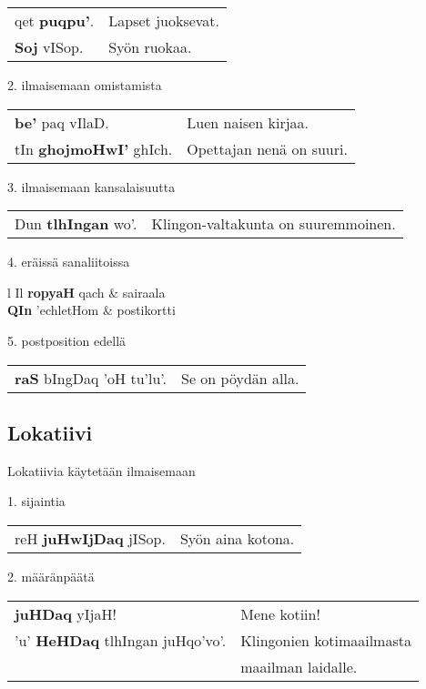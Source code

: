 \documentclass{book}
\begin{document}
\begin{tabular}{l l}
    qet \textbf{puqpu'}. & Lapset juoksevat. \\
    \textbf{Soj} vISop. & Syön ruokaa. \\
\end{tabular}

2. ilmaisemaan omistamista

\begin{tabular}{l l}
    \textbf{be'} paq vIlaD. & Luen naisen kirjaa. \\
    tIn \textbf{ghojmoHwI'} ghIch. & Opettajan nenä on suuri. \\
\end{tabular}

3. ilmaisemaan kansalaisuutta

\begin{tabular}{l l}
    Dun \textbf{tlhIngan} wo'. & Klingon-valtakunta on suuremmoinen. \\
\end{tabular}

4. eräissä sanaliitoissa

\begin{tabular}{l Il}
    \textbf{ropyaH} qach & sairaala \\
    \textbf{QIn} 'echletHom & postikortti \\
\end{tabular}

5. postposition edellä

\begin{tabular}{l l}
    \textbf{raS} bIngDaq 'oH tu'lu'. & Se on pöydän alla. \\
\end{tabular}

\subsection{Lokatiivi}

Lokatiivia käytetään ilmaisemaan

1. sijaintia

\begin{tabular}{l l}
    reH \textbf{juHwIjDaq} jISop. & Syön aina kotona. \\
\end{tabular}

2. määränpäätä

\begin{tabular}{l l}
    \textbf{juHDaq} yIjaH! & Mene kotiin! \\
    'u' \textbf{HeHDaq} tlhIngan juHqo'vo'. & Klingonien kotimaailmasta \\
    & maailman laidalle. \\
\end{tabular}
\end{document}

